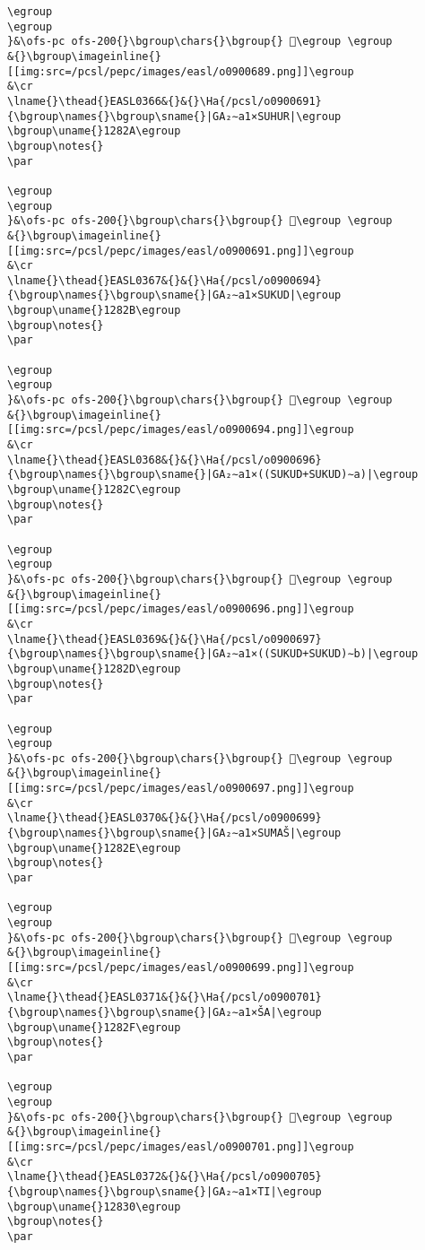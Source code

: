 \begin{verbatim}
\egroup
\egroup
}&\ofs-pc ofs-200{}\bgroup\chars{}\bgroup{} 𒠩\egroup \egroup
&{}\bgroup\imageinline{}[[img:src=/pcsl/pepc/images/easl/o0900689.png]]\egroup
&\cr
\lname{}\thead{}EASL0366&{}&{}\Ha{/pcsl/o0900691}{\bgroup\names{}\bgroup\sname{}|GA₂∼a1×SUHUR|\egroup
\bgroup\uname{}1282A\egroup
\bgroup\notes{}
\par 

\egroup
\egroup
}&\ofs-pc ofs-200{}\bgroup\chars{}\bgroup{} 𒠪\egroup \egroup
&{}\bgroup\imageinline{}[[img:src=/pcsl/pepc/images/easl/o0900691.png]]\egroup
&\cr
\lname{}\thead{}EASL0367&{}&{}\Ha{/pcsl/o0900694}{\bgroup\names{}\bgroup\sname{}|GA₂∼a1×SUKUD|\egroup
\bgroup\uname{}1282B\egroup
\bgroup\notes{}
\par 

\egroup
\egroup
}&\ofs-pc ofs-200{}\bgroup\chars{}\bgroup{} 𒠫\egroup \egroup
&{}\bgroup\imageinline{}[[img:src=/pcsl/pepc/images/easl/o0900694.png]]\egroup
&\cr
\lname{}\thead{}EASL0368&{}&{}\Ha{/pcsl/o0900696}{\bgroup\names{}\bgroup\sname{}|GA₂∼a1×((SUKUD+SUKUD)∼a)|\egroup
\bgroup\uname{}1282C\egroup
\bgroup\notes{}
\par 

\egroup
\egroup
}&\ofs-pc ofs-200{}\bgroup\chars{}\bgroup{} 𒠬\egroup \egroup
&{}\bgroup\imageinline{}[[img:src=/pcsl/pepc/images/easl/o0900696.png]]\egroup
&\cr
\lname{}\thead{}EASL0369&{}&{}\Ha{/pcsl/o0900697}{\bgroup\names{}\bgroup\sname{}|GA₂∼a1×((SUKUD+SUKUD)∼b)|\egroup
\bgroup\uname{}1282D\egroup
\bgroup\notes{}
\par 

\egroup
\egroup
}&\ofs-pc ofs-200{}\bgroup\chars{}\bgroup{} 𒠭\egroup \egroup
&{}\bgroup\imageinline{}[[img:src=/pcsl/pepc/images/easl/o0900697.png]]\egroup
&\cr
\lname{}\thead{}EASL0370&{}&{}\Ha{/pcsl/o0900699}{\bgroup\names{}\bgroup\sname{}|GA₂∼a1×SUMAŠ|\egroup
\bgroup\uname{}1282E\egroup
\bgroup\notes{}
\par 

\egroup
\egroup
}&\ofs-pc ofs-200{}\bgroup\chars{}\bgroup{} 𒠮\egroup \egroup
&{}\bgroup\imageinline{}[[img:src=/pcsl/pepc/images/easl/o0900699.png]]\egroup
&\cr
\lname{}\thead{}EASL0371&{}&{}\Ha{/pcsl/o0900701}{\bgroup\names{}\bgroup\sname{}|GA₂∼a1×ŠA|\egroup
\bgroup\uname{}1282F\egroup
\bgroup\notes{}
\par 

\egroup
\egroup
}&\ofs-pc ofs-200{}\bgroup\chars{}\bgroup{} 𒠯\egroup \egroup
&{}\bgroup\imageinline{}[[img:src=/pcsl/pepc/images/easl/o0900701.png]]\egroup
&\cr
\lname{}\thead{}EASL0372&{}&{}\Ha{/pcsl/o0900705}{\bgroup\names{}\bgroup\sname{}|GA₂∼a1×TI|\egroup
\bgroup\uname{}12830\egroup
\bgroup\notes{}
\par 


\end{verbatim}
